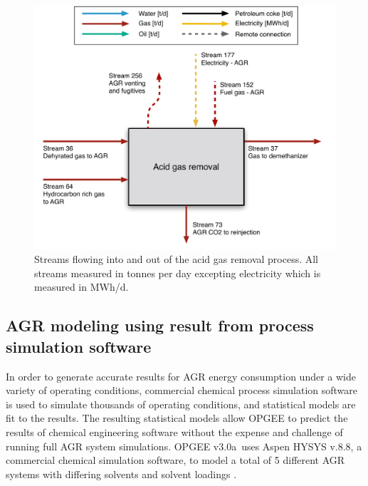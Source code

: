 \documentclass[11pt]{report}
\newcommand{\version}{v3.0a}
\begin{document}
\begin{figure}
\includegraphics[width=0.85\columnwidth]{images/Acid_gas_removal_PF.pdf}
\caption{Streams flowing into and out of the acid gas removal process. All streams measured in tonnes per day excepting electricity which is measured in MWh/d.}
\label{fig:acid_gas_removal_PF}
\end{figure}


\subsection{AGR modeling using result from process simulation software} \label{AGRaspen}


In order to generate accurate results for AGR energy consumption under a wide variety of operating conditions, commercial chemical process simulation software is used to simulate thousands of operating conditions, and statistical models are fit to the results. The resulting statistical models allow OPGEE to predict the results of chemical engineering software without the expense and challenge of running full AGR system simulations. OPGEE \version \, uses Aspen HYSYS v.8.8, a commercial chemical simulation software, to model a total of 5 different AGR systems with differing solvents and solvent loadings \cite{Aspentech2016}. 
\end{document}
